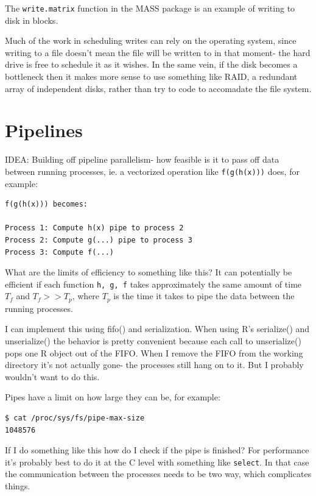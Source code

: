 \documentclass[12pt]{article}
\begin{document}
The \texttt{write.matrix} function in the MASS package is an example of
writing to disk in blocks.

Much of the work in scheduling writes can rely on the operating system,
since writing to a file doesn't mean the file will be written to in that
moment- the hard drive is free to schedule it as it wishes. In the same
vein, if the disk becomes a bottleneck then it makes more sense to use
something like RAID, a redundant array of independent disks, rather than
try to code to accomadate the file system.

\section{Pipelines}

IDEA: Building off pipeline parallelism- how feasible is it to pass off
data between running processes, ie. a vectorized operation like
\texttt{f(g(h(x)))} does, for example:

\begin{verbatim}
f(g(h(x))) becomes:

Process 1: Compute h(x) pipe to process 2
Process 2: Compute g(...) pipe to process 3
Process 3: Compute f(...)
\end{verbatim}

What are the limits of efficiency to something like this? It can
potentially be
efficient if each function \texttt{h, g, f} takes approximately the same
amount of time $T_f$ and $T_f >> T_p$, where $T_p$ is the time it takes to
pipe the data between the running processes. 

I can implement this using fifo() and serialization. When using R's
serialize() and unserialize() the behavior is pretty convenient because
each call to unserialize() pops one R object out of the FIFO.
When I remove the FIFO from the working directory it's not actually gone-
the processes still hang on to it. But I probably wouldn't want to do this.

Pipes have a limit on how large they can be, for example:
\begin{verbatim}
$ cat /proc/sys/fs/pipe-max-size
1048576
\end{verbatim}

If I do something like this how do I check if the pipe is finished?
For performance it's probably best to do it at the C level with something
like \texttt{select}. In that case the communication between the processes
needs to be two way, which complicates things.
\end{document}
